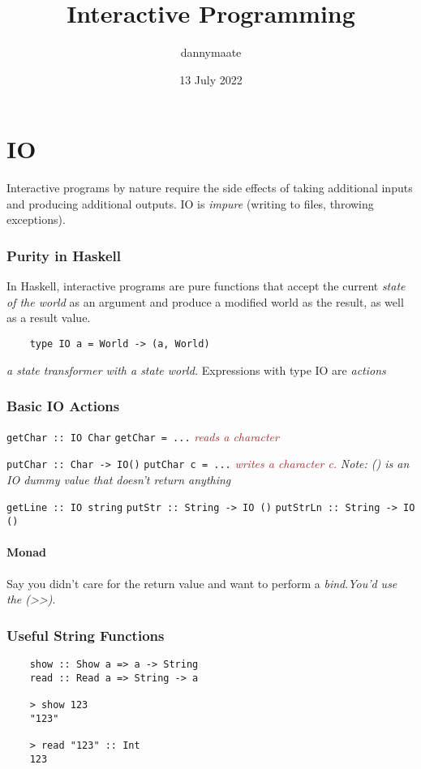 \documentclass{article}
\title{Interactive Programming}
\author{dannymaate}
\date{13 July 2022}
\begin{document}
\maketitle

\section{IO}
Interactive programs by nature require the side effects of taking additional inputs and producing additional outputs. IO is \textcolor{Rhodamine}{\emph{impure}} (writing to files, throwing exceptions). 

\subsubsection*{Purity in Haskell}
In Haskell, interactive programs are pure functions that accept the current \emph{state of the world} as an argument and produce a modified world as the result, as well as a result value. 

\begin{verbatim}
    type IO a = World -> (a, World)
\end{verbatim}
\emph{a state transformer with a state world.}
Expressions with type IO are \textcolor{Rhodamine}{\emph{actions}}

\subsubsection*{Basic IO Actions}
\texttt{getChar :: IO Char} \newline
\texttt{getChar = ...} \emph{\textcolor{Brown}{reads a character}} \newline

\noindent \texttt{putChar :: Char -> IO()} \newline
\texttt{putChar c = ...} \emph{\textcolor{Brown}{writes a character c.}}
\textcolor{Rhodamine}{\emph{Note: () is an IO dummy value that doesn't return anything}} \newline

\noindent \texttt{getLine :: IO string} \newline 
\noindent \texttt{putStr :: String -> IO ()} \newline
\noindent \texttt{putStrLn :: String -> IO ()}

\paragraph{Monad}
Say you didn't care for the return value and want to perform a \textcolor{Rhodamine}{\emph{bind}}.\textcolor{Emerald}{\emph{You'd use the (>>)}}.

\subsubsection*{Useful String Functions}
\begin{verbatim}
    show :: Show a => a -> String
    read :: Read a => String -> a
    
    > show 123 
    "123"
    
    > read "123" :: Int 
    123

    
    
\end{verbatim}
\end{document}
